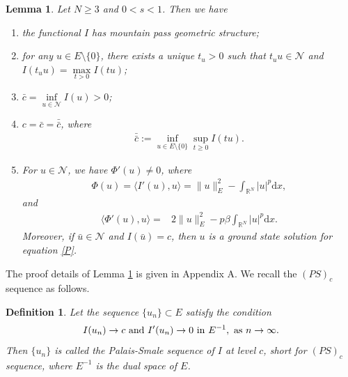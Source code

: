 \documentclass[12pt,a4paper,reqno]{amsart}
\numberwithin{equation}{section}
\newtheorem{lemma}{Lemma}[section]
\newtheorem{definition}{Definition}[section]
\begin{document}
\begin{lemma}\label{Lemma4.1}
Let $N\geqslant3$ and $0<s<1$.
Then we have

\begin{enumerate}
\item [(1)]
the functional $I$ has mountain pass geometric structure;


\item [(2)]
for any $u\in E\setminus\{0\}$, there exists a unique $t_{u}>0$ such that $t_{u}u\in \mathcal{N}$ and $I(t_{u}u)=\max\limits_{t>0}I(tu)$;

\item [(3)]
 $\bar{c}=\inf\limits_{u\in\mathcal{N}}I(u)>0$;

\item [(4)]
$c=\bar{c}=\bar{\bar{c}}$,
where
\begin{equation*}
\begin{aligned}
\bar{\bar{c}}:=\inf\limits_{u\in E\setminus\{0\}}\sup\limits_{t\geqslant 0}I(tu).
\end{aligned}
\end{equation*}

\item [(5)]
For $u\in \mathcal{N}$, we have $\Phi'(u)\not=0$, where
\begin{equation}\label{4.1}
\begin{aligned}
\Phi(u)=\langle I'(u),u\rangle=\|u\|_{E}^{2}-\int_{\mathbb{R}^{N}}|u|^{p}\mathrm{d}x,
\end{aligned}
\end{equation}
and
\begin{equation}\label{4.2}
\begin{aligned}
\langle\Phi'(u),u\rangle
=&2\|u\|_{E}^{2}
-p\beta\int_{\mathbb{R}^{N}}|u|^{p}\mathrm{d}x.
\end{aligned}
\end{equation}
Moreover, if $\bar{u}\in \mathcal{N}$ and $I(\bar{u})=c$, then $u$ is a ground state solution for equation \eqref{P}.
\end{enumerate}
\end{lemma}

The proof details of Lemma \ref{Lemma4.1} is given in Appendix A.
We recall the $(PS)_{c}$ sequence as follows.
\begin{definition}
Let the sequence $\{u_{n}\}\subset E$ satisfy the condition
\begin{equation*}
\begin{aligned}
I(u_{n})\rightarrow c
~\mathrm{and}~I'(u_{n})\rightarrow 0
~\mathrm{in}~E^{-1},
~{\rm as}~n\to\infty.
\end{aligned}
\end{equation*}
Then $\{u_{n}\}$ is called the Palais-Smale sequence of $I$ at level $c$, short for $(PS)_{c}$ sequence,
where $E^{-1}$ is the dual space of $E$.
\end{definition}
\end{document}
